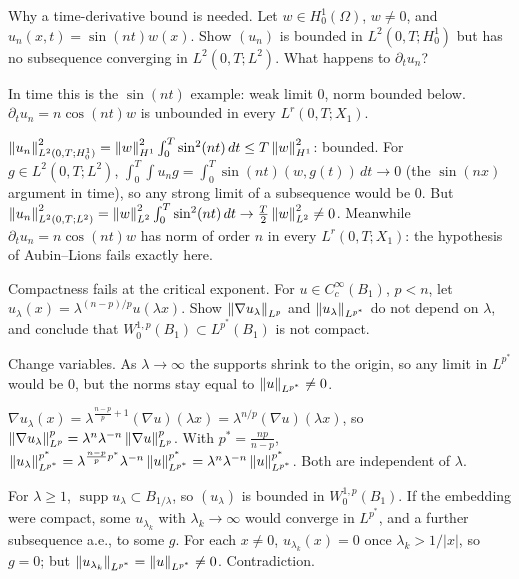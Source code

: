\begin{exercise}
  Why a time-derivative bound is needed. Let $w \in H^1_0(\Omega)$, $w \ne 0$, and $u_n(x,t) = \sin(nt)w(x)$. Show $(u_n)$ is bounded in $L^2(0,T;H^1_0)$ but has no subsequence converging in $L^2(0,T;L^2)$. What happens to $\partial_t u_n$?
  \begin{hint}
    In time this is the $\sin(nt)$ example: weak limit $0$, norm bounded below. $\partial_t u_n = n\cos(nt)w$ is unbounded in every $L^r(0,T;X_1)$.
  \end{hint}
  \begin{solution}
    $\left\lVert u_n\right\rVert_{L^2(0,T;H^1_0)}^2 = \left\lVert w\right\rVert_{H^1}^2\int_0^T\sin^2(nt)\,dt \le T\left\lVert w\right\rVert_{H^1}^2$: bounded. For $g \in L^2(0,T;L^2)$, $\int_0^T\!\!\int u_ng = \int_0^T\sin(nt)(w, g(t))\,dt \to 0$ (the $\sin(nx)$ argument in time), so any strong limit of a subsequence would be $0$. But $\left\lVert u_n\right\rVert_{L^2(0,T;L^2)}^2 = \left\lVert w\right\rVert_{L^2}^2\int_0^T\sin^2(nt)\,dt \to \frac T2\left\lVert w\right\rVert_{L^2}^2 \ne 0$. Meanwhile $\partial_tu_n = n\cos(nt)w$ has norm of order $n$ in every $L^r(0,T;X_1)$: the hypothesis of Aubin--Lions fails exactly here.
  \end{solution}
\end{exercise}

\begin{exercise}
  Compactness fails at the critical exponent. For $u \in C_c^\infty(B_1)$, $p < n$, let $u_\lambda(x) = \lambda^{(n-p)/p}u(\lambda x)$. Show $\left\lVert \nabla u_\lambda\right\rVert_{L^p}$ and $\left\lVert u_\lambda\right\rVert_{L^{p^*}}$ do not depend on $\lambda$, and conclude that $W^{1,p}_0(B_1) \subset L^{p^*}(B_1)$ is not compact.
  \begin{hint}
    Change variables. As $\lambda \to \infty$ the supports shrink to the origin, so any limit in $L^{p^*}$ would be $0$, but the norms stay equal to $\left\lVert u\right\rVert_{L^{p^*}} \ne 0$.
  \end{hint}
  \begin{solution}
    $\nabla u_\lambda(x) = \lambda^{\frac{n-p}{p}+1}(\nabla u)(\lambda x) = \lambda^{n/p}(\nabla u)(\lambda x)$, so $\left\lVert \nabla u_\lambda\right\rVert_{L^p}^p = \lambda^n\lambda^{-n}\left\lVert \nabla u\right\rVert_{L^p}^p$. With $p^* = \frac{np}{n-p}$, $\left\lVert u_\lambda\right\rVert_{L^{p^*}}^{p^*} = \lambda^{\frac{n-p}{p}p^*}\lambda^{-n}\left\lVert u\right\rVert_{L^{p^*}}^{p^*} = \lambda^n\lambda^{-n}\left\lVert u\right\rVert_{L^{p^*}}^{p^*}$. Both are independent of $\lambda$.

    For $\lambda \ge 1$, $\operatorname{supp}u_\lambda \subset B_{1/\lambda}$, so $(u_\lambda)$ is bounded in $W^{1,p}_0(B_1)$. If the embedding were compact, some $u_{\lambda_k}$ with $\lambda_k \to \infty$ would converge in $L^{p^*}$, and a further subsequence a.e., to some $g$. For each $x \ne 0$, $u_{\lambda_k}(x) = 0$ once $\lambda_k > 1/|x|$, so $g = 0$; but $\left\lVert u_{\lambda_k}\right\rVert_{L^{p^*}} = \left\lVert u\right\rVert_{L^{p^*}} \ne 0$. Contradiction.
  \end{solution}
\end{exercise}

